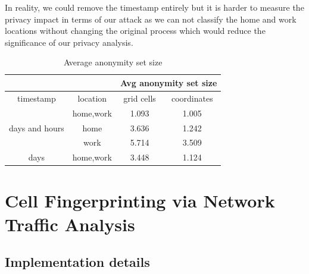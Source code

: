 \documentclass[10pt,conference,compsocconf]{IEEEtran}
\begin{document}
In reality, we could remove the timestamp entirely but it is harder to measure the privacy impact in terms of our attack as we can not classify the home and work locations without changing the original process which would reduce the significance of our privacy analysis.

\begin{table}[h!]
\centering
\begin{tabular}{ |c|c|c|c| } 
\hline
 &  & \multicolumn{2}{c|}{Avg anonymity set size} \\
 \hline
timestamp & location & grid cells & coordinates\\
\hline
\hline
\multirow{3}{4em}{days and hours} & home,work & 1.093 & 1.005 \\ 
& home & 3.636 & 1.242 \\ 
& work & 5.714 & 3.509 \\ 
\hline
days & home,work & 3.448 & 1.124 \\ 
\hline
\end{tabular}
\caption{\label{tab:anonset}Average anonymity set size}
\end{table}


\section{Cell Fingerprinting via Network Traffic Analysis}

\subsection{Implementation details}
\end{document}
